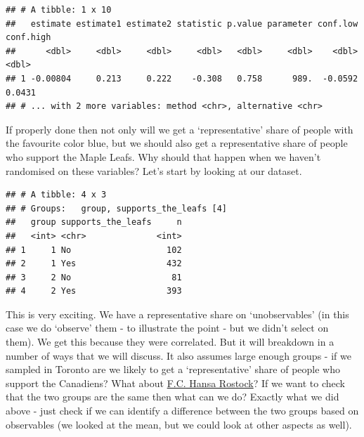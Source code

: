 \documentclass[
]{book}
\newenvironment{Shaded}{\begin{snugshade}}{\end{snugshade}}
\newcommand{\DecValTok}[1]{\textcolor[rgb]{0.00,0.00,0.81}{#1}}
\newcommand{\KeywordTok}[1]{\textcolor[rgb]{0.13,0.29,0.53}{\textbf{#1}}}
\newcommand{\NormalTok}[1]{#1}
\newcommand{\OperatorTok}[1]{\textcolor[rgb]{0.81,0.36,0.00}{\textbf{#1}}}
\newcommand{\StringTok}[1]{\textcolor[rgb]{0.31,0.60,0.02}{#1}}
\begin{document}
\begin{verbatim}
## # A tibble: 1 x 10
##   estimate estimate1 estimate2 statistic p.value parameter conf.low conf.high
##      <dbl>     <dbl>     <dbl>     <dbl>   <dbl>     <dbl>    <dbl>     <dbl>
## 1 -0.00804     0.213     0.222    -0.308   0.758      989.  -0.0592    0.0431
## # ... with 2 more variables: method <chr>, alternative <chr>
\end{verbatim}

If properly done then not only will we get a `representative' share of people with the favourite color blue, but we should also get a representative share of people who support the Maple Leafs. Why should that happen when we haven't randomised on these variables? Let's start by looking at our dataset.

\begin{Shaded}
\end{Shaded}

\begin{verbatim}
## # A tibble: 4 x 3
## # Groups:   group, supports_the_leafs [4]
##   group supports_the_leafs     n
##   <int> <chr>              <int>
## 1     1 No                   102
## 2     1 Yes                  432
## 3     2 No                    81
## 4     2 Yes                  393
\end{verbatim}

This is very exciting. We have a representative share on `unobservables' (in this case we do `observe' them - to illustrate the point - but we didn't select on them). We get this because they were correlated. But it will breakdown in a number of ways that we will discuss. It also assumes large enough groups - if we sampled in Toronto are we likely to get a `representative' share of people who support the Canadiens? What about \href{https://www.fc-hansa.de/}{F.C. Hansa Rostock}? If we want to check that the two groups are the same then what can we do? Exactly what we did above - just check if we can identify a difference between the two groups based on observables (we looked at the mean, but we could look at other aspects as well).
\end{document}
